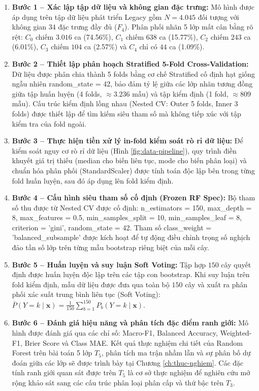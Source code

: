\begin{enumerate}
    \item \textbf{Bước 1 -- Xác lập tập dữ liệu và không gian đặc trưng:} 
    Mô hình được áp dụng trên tập dữ liệu phát triển Legacy gồm $N = 4.045$ đối tượng với không gian 34 đặc trưng đầy đủ ($F_4$). Phân phối nhãn 5 lớp mất cân bằng rõ rệt: $C_0$ chiếm $3.016$ ca (74.56\%), $C_1$ chiếm $638$ ca (15.77\%), $C_2$ chiếm $243$ ca (6.01\%), $C_3$ chiếm $104$ ca (2.57\%) và $C_4$ chỉ có $44$ ca (1.09\%).
    
    \item \textbf{Bước 2 -- Thiết lập phân hoạch Stratified 5-Fold Cross-Validation:} 
    Dữ liệu được phân chia thành 5 folds bằng cơ chế Stratified cố định hạt giống ngẫu nhiên \textnormal{random\_state = 42}, bảo đảm tỷ lệ giữa các lớp nhãn tương đồng giữa tập huấn luyện (4 folds, $\approx 3.236$ mẫu) và tập kiểm định (1 fold, $\approx 809$ mẫu). Cấu trúc kiểm định lồng nhau (Nested CV: Outer 5 folds, Inner 3 folds) được thiết lập để tìm kiếm siêu tham số mà không tiếp xúc với tập kiểm tra của fold ngoài.
    
    \item \textbf{Bước 3 -- Thực hiện tiền xử lý in-fold kiểm soát rò rỉ dữ liệu:} 
    Để kiểm soát nguy cơ rò rỉ dữ liệu (Hình \ref{fig:data-pipeline}), quy trình điền khuyết giá trị thiếu (median cho biến liên tục, mode cho biến phân loại) và chuẩn hóa phân phối (StandardScaler) được tính toán độc lập bên trong từng fold huấn luyện, sau đó áp dụng lên fold kiểm định.
    
    \item \textbf{Bước 4 -- Cấu hình siêu tham số cố định (Frozen RF Spec):} 
    Bộ tham số thu được từ Nested CV được cố định: \textnormal{n\_estimators = 150, max\_depth = 8, max\_features = 0.5, min\_samples\_split = 10, min\_samples\_leaf = 8, criterion = 'gini', random\_state = 42}. Tham số \textnormal{class\_weight = 'balanced\_subsample'} được kích hoạt để tự động điều chỉnh trọng số nghịch đảo tần số lớp trên từng mẫu bootstrap riêng biệt của mỗi cây.
    
    \item \textbf{Bước 5 -- Huấn luyện và suy luận Soft Voting:} 
    Tập hợp $150$ cây quyết định được huấn luyện độc lập trên các tập con bootstrap. Khi suy luận trên fold kiểm định, mẫu dữ liệu được đưa qua toàn bộ $150$ cây và xuất ra phân phối xác suất trung bình liên tục (Soft Voting): $\bar{P}(Y = k \mid \mathbf{x}) = \frac{1}{150}\sum_{b=1}^{150} P_b(Y = k \mid \mathbf{x})$.
    
    \item \textbf{Bước 6 -- Đánh giá hiệu năng và phân tích đặc điểm ranh giới:} 
    Mô hình được đánh giá qua các chỉ số: Macro-F1, Balanced Accuracy, Weighted-F1, Brier Score và Class MAE. Kết quả thực nghiệm chi tiết của Random Forest trên bài toán 5 lớp $T_5$, phân tích ma trận nhầm lẫn và sự phân bố dự đoán giữa các lớp sẽ được trình bày tại Chương \ref{ch:thuc-nghiem}. Các đặc tính ranh giới quan sát được trên $T_5$ là cơ sở thực nghiệm để nghiên cứu mở rộng khảo sát sang các cấu trúc phân loại phân cấp và thứ bậc trên $T_3$.
\end{enumerate}

